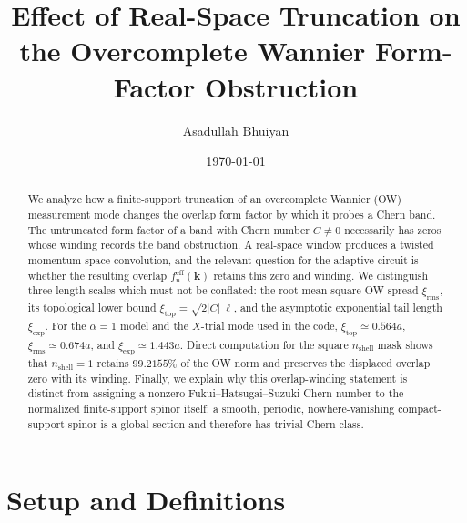 \documentclass[aps,prb,onecolumn,nofootinbib,superscriptaddress]{revtex4-2}
\newcommand{\mbf}[1]{\mathbf{#1}}
\begin{document}
\title{Effect of Real-Space Truncation on the Overcomplete Wannier Form-Factor Obstruction}

\author{Asadullah Bhuiyan}
\date{\today}

\begin{abstract}
We analyze how a finite-support truncation of an overcomplete Wannier (OW) measurement mode changes the overlap form factor by which it probes a Chern band.  The untruncated form factor of a band with Chern number $C\neq0$ necessarily has zeros whose winding records the band obstruction.  A real-space window produces a twisted momentum-space convolution, and the relevant question for the adaptive circuit is whether the resulting overlap $f_n^{\mathrm{eff}}(\mbf{k})$ retains this zero and winding.  We distinguish three length scales which must not be conflated: the root-mean-square OW spread $\xi_{\mathrm{rms}}$, its topological lower bound $\xi_{\mathrm{top}}=\sqrt{2|C|}\,\ell$, and the asymptotic exponential tail length $\xi_{\mathrm{exp}}$.  For the $\alpha=1$ model and the $X$-trial mode used in the code, $\xi_{\mathrm{top}}\simeq0.564a$, $\xi_{\mathrm{rms}}\simeq0.674a$, and $\xi_{\mathrm{exp}}\simeq1.443a$.  Direct computation for the square $n_{\mathrm{shell}}$ mask shows that $n_{\mathrm{shell}}=1$ retains $99.2155\%$ of the OW norm and preserves the displaced overlap zero with its winding.  Finally, we explain why this overlap-winding statement is distinct from assigning a nonzero Fukui--Hatsugai--Suzuki Chern number to the normalized finite-support spinor itself: a smooth, periodic, nowhere-vanishing compact-support spinor is a global section and therefore has trivial Chern class.
\end{abstract}

\maketitle
\setcounter{tocdepth}{2}
\tableofcontents

\section{Setup and Definitions}
\label{sec:setup}
\end{document}
